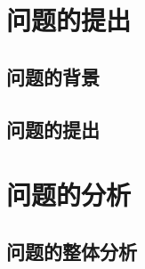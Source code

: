 \documentclass{MathorCupmodeling}
\begin{document}
	\begin{abstract}
	请使用 \TeX Live 2019，XeLaTeX 编译，请选用支持 UTF­-8 编码的编辑器。

		使用者需要有一定的 \LaTeX{} 的使用经验（{\heiti 任务期三个月以内不建议使用 \LaTeX}，因此本文没有介绍基础使用），至少要会使用常用宏包的一些功能，比如参考文献，数学公式，图片使用，列表环境等等。模板已经添加了常用的宏包，无需用户再额外添加。

		本模板
		\begin{itemize}
			\item 定义了几个宏 \lstinline|\def\ee{\mathrm{e}},\def\ii{\mathrm{i}},\def\leq{\leqslant},\def\geq{\geqslant}| 方便使用；
			\item 图片应放在 \lstinline|figure| 文件夹中；
			\item 定制了 matlab 和 python 代码环境，使用方法：\lstinline|\begin{matlab} content \end{matlab}| 和 \lstinline|\begin{python} content \end{python}|；
			\item 加载了 \lstinline|cleveref| 宏包，使用方法：\lstinline|\cref{label}|。
		\end{itemize}
		其它的就是跟普通的 \lstinline|ctexart| 使用方法一样。
	
		欢迎到 \url{https://wenda.latexstudio.net/} 和 \url{https://github.com/CTeX-org/forum} 提问，注意提供 MWE，提问步骤可参考 \url{https://paste.ubuntu.com/p/wRq2mFCvWC/}。

	\end{abstract}
	\tableofcontents\newpage
	\section{问题的提出}
	\zhlipsum*[2]
	\subsection{问题的背景}
	\zhlipsum*[3]
	\subsection{问题的提出}
	\zhlipsum*[4]

	\section{问题的分析}
	\zhlipsum*[5]
	\subsection{问题的整体分析}
	\zhlipsum*[6]
\end{document}
